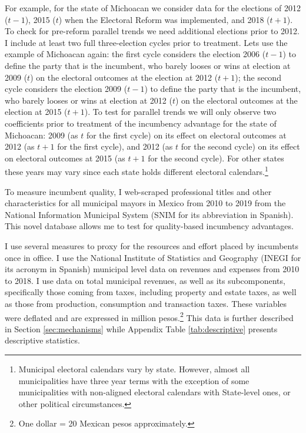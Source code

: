 \documentclass[12pt]{amsart}
\numberwithin{equation}{section}
\theoremstyle{definition}
\theoremstyle{definition}
\theoremstyle{definition}
\begin{document}
For example, for the state of Michoacan we consider data for the elections of 2012 ($t-1$), 2015 ($t$) when the Electoral Reform was implemented, and 2018 ($t+1$). To check for pre-reform parallel trends we need additional elections prior to 2012. I include at least two full three-election cycles prior to treatment. Lets use the example of Michoacan again: the first cycle considers the election 2006 ($t-1$) to define the party that is the incumbent, who barely looses or wins at election at 2009 ($t$) on the electoral outcomes at the election at 2012 ($t+1$); the second cycle considers the election 2009 ($t-1$) to define the party that is the incumbent, who barely looses or wins at election at 2012 ($t$) on the electoral outcomes at the election at 2015 ($t+1$). To test for parallel trends we will only observe two coefficients prior to treatment of the incumbency advantage for the state of Michoacan: 2009 (as $t$ for the first cycle) on its effect on electoral outcomes at 2012 (as $t+1$ for the first cycle), and 2012 (as $t$ for the second cycle) on its effect on electoral outcomes at 2015 (as $t+1$ for the second cycle).   For other states these years may vary since each state holds different electoral calendars.\footnote{Municipal electoral calendars vary by state. However, almost all municipalities have three year terms with the exception of some municipalities with non-aligned electoral calendars with State-level ones, or other political circumstances.}


To measure incumbent quality, I web-scraped professional titles and other characteristics for all municipal mayors in Mexico from 2010 to 2019 from the National Information Municipal System (SNIM for its abbreviation in Spanish). This novel database allows me to test for quality-based incumbency advantages.

I use several measures to proxy for the resources and effort placed by incumbents once in office. I use the National Institute of Statistics and Geography (INEGI for its acronym in Spanish) municipal level data on revenues and expenses from 2010 to 2018. I use data on total municipal revenues, as well as its subcomponents, specifically those coming from taxes, including property and estate taxes, as well as those from production, consumption and transaction taxes. These variables were deflated and are expressed in million pesos.\footnote{One dollar = 20 Mexican pesos approximately.} This data is further described in Section \ref{sec:mechanisms} while Appendix Table \ref{tab:descriptive} presents descriptive statistics.
  
\end{document}
